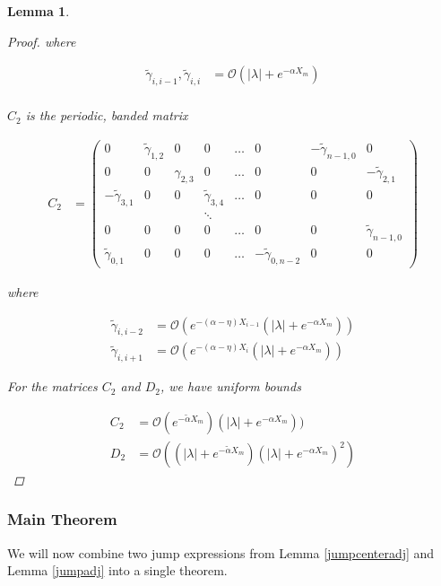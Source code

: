 \documentclass[12pt]{article}
\newtheorem{lemma}{Lemma}
\begin{document}
\begin{lemma}
\begin{proof}
where 

\begin{align*}
\tilde{\gamma}_{i,i-1}, \tilde{\gamma}_{i,i} &= \mathcal{O}(|\lambda| + e^{-\alpha X_m}) \\
\end{align*}

$C_2$ is the periodic, banded matrix

\begin{align*}
C_2 &= \begin{pmatrix}
0 & \tilde{\gamma}_{1,2} & 0 & 0 & \dots & 0 & -\tilde{\gamma}_{n-1,0} & 0 \\
0 & 0 & \gamma_{2,3} & 0 & \dots & 0 & 0 & -\tilde{\gamma}_{2,1} \\
-\tilde{\gamma}_{3,1} & 0 & 0 & \tilde{\gamma}_{3,4} & \dots & 0 & 0 & 0 \\
&  & & \ddots  \\
0 & 0 & 0 & 0 & \dots & 0 & 0 & \tilde{\gamma}_{n-1,0} \\
\tilde{\gamma}_{0,1} & 0 & 0 & 0 & \dots & -\tilde{\gamma}_{0, n-2} & 0 & 0 
\end{pmatrix}
\end{align*}

where

\begin{align*}
\tilde{\gamma}_{i,i-2} &= \mathcal{O}(e^{-(\alpha - \eta) X_{i-1}}(|\lambda| + e^{-\alpha X_m})) \\
\tilde{\gamma}_{i,i+1} &= \mathcal{O}(e^{-(\alpha - \eta) X_i}(|\lambda| + e^{-\alpha X_m}))
\end{align*}

For the matrices $C_2$ and $D_2$, we have uniform bounds

\begin{align*}
C_2 &= \mathcal{O}(e^{-\tilde{\alpha}X_m})(|\lambda| + e^{-\alpha X_m})) \\
D_2 &= \mathcal{O}((|\lambda| + e^{-\tilde{\alpha} X_m})(|\lambda| + e^{-\alpha X_m})^2)
\end{align*}

\end{proof}
\end{lemma}

\subsubsection{Main Theorem}

We will now combine two jump expressions from Lemma \ref{jumpcenteradj} and Lemma \ref{jumpadj} into a single theorem.
\end{document}
